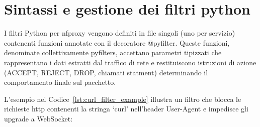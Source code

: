 \section{Sintassi e gestione dei filtri python}

I filtri Python per \gls{nfproxy} vengono definiti in file singoli (uno per servizio) contenenti funzioni annotate con il decoratore @pyfilter. Queste funzioni, denominate collettivamente pyfilters, accettano parametri tipizzati che rappresentano i dati estratti dal traffico di rete e restituiscono istruzioni di azione (ACCEPT, REJECT, DROP, chiamati statment) determinando il comportamento finale sul pacchetto.  

L'esempio nel Codice~\ref{lst:curl_filter_example} illustra un filtro che blocca le richieste \gls{http} contenenti la stringa `curl' nell'header User-Agent e impedisce gli upgrade a WebSocket:

